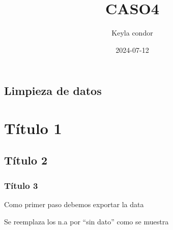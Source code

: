 \documentclass[
]{article}
\title{CASO4}
\author{Keyla condor}
\date{2024-07-12}
\begin{document}
\maketitle

\subsection{Limpieza de datos}\label{limpieza-de-datos}

\section{Título 1}\label{tuxedtulo-1}

\subsection{Título 2}\label{tuxedtulo-2}

\subsubsection{Título 3}\label{tuxedtulo-3}

Como primer paso debemos exportar la data

Se reemplaza los n.a por ``sin dato'' como se muestra
\end{document}
